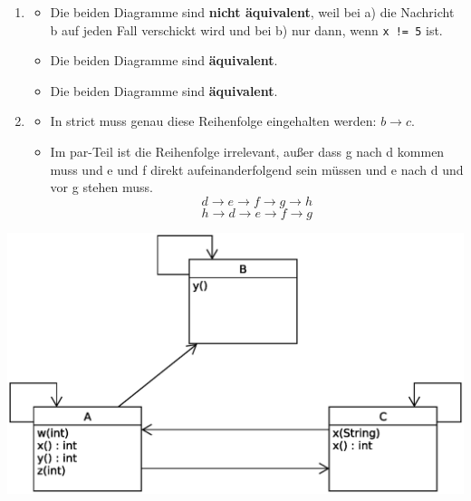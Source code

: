\documentclass[a4paper, 12pt, margins=2.5cm]{homework}
\begin{document}
  \begin{problem}
    
  \end{problem}
  \begin{solution} \hfill
    \begin{enumerate}[label=\alph*)]\itemsep0pt
      \item
        \begin{itemize}  
          \item Die beiden Diagramme sind \textbf{nicht äquivalent}, weil bei a) die
                Nachricht b auf jeden Fall verschickt wird und bei b) nur dann, wenn
                \texttt{x != 5} ist.

          \item Die beiden Diagramme sind \textbf{äquivalent}.

          \item Die beiden Diagramme sind \textbf{äquivalent}.
        \end{itemize}

      \item 
        \begin{itemize}
          \item In strict muss genau diese Reihenfolge eingehalten werden: $b\rightarrow c$.
          \item Im par-Teil ist die Reihenfolge irrelevant, außer dass g nach d
                kommen muss und e und f direkt aufeinanderfolgend sein müssen und
                e nach d und vor g stehen muss.
                \[ d\rightarrow e\rightarrow f\rightarrow g\rightarrow h \]
                \[ h\rightarrow d\rightarrow e\rightarrow f\rightarrow g  \]
        \end{itemize}
    \end{enumerate}
  \end{solution}


  \begin{problem}
    
  \end{problem}
  \begin{solution}\hfill
    \begin{center}
      \includegraphics[scale=0.6]{Aufgabe5.eps}
    \end{center}
  \end{solution}


  \begin{problem}
    
  \end{problem}
  \begin{solution}
    
  \end{solution}
\end{document}
